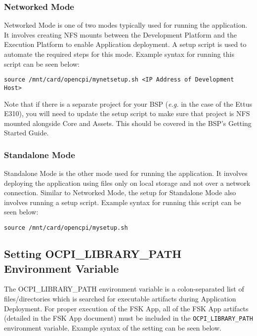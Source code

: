 \begin{flushleft}
\subsubsection{Networked Mode}
Networked Mode is one of two modes typically used for running the application. It involves creating NFS mounts between the Development Platform and the Execution Platform to enable Application deployment. A setup script is used to automate the required steps for this mode. Example syntax for running this script can be seen below:
\begin{verbatim}
source /mnt/card/opencpi/mynetsetup.sh <IP Address of Development Host>
\end{verbatim}
Note that if there is a separate project for your BSP (\textit{e.g.} in the case of the Ettus E310), you will need to update the setup script to make sure that project is NFS mounted alongside Core and Assets. This should be covered in the BSP's Getting Started Guide.
\subsubsection{Standalone Mode}
Standalone Mode is the other mode used for running the application. It involves deploying the application using files only on local storage and not over a network connection. Similar to Networked Mode, the setup for Standalone Mode also involves running a setup script. Example syntax for running this script can be seen below:
\begin{verbatim}
source /mnt/card/opencpi/mysetup.sh
\end{verbatim}
\subsection{Setting OCPI\_LIBRARY\_PATH Environment Variable}
The OCPI\_LIBRARY\_PATH environment variable is a colon-separated list of files/directories which is searched for executable artifacts during Application Deployment. For proper execution of the FSK App, all of the FSK App artifacts (detailed in the FSK App document) must be included in the \texttt{OCPI\_LIBRARY\_PATH} environment variable. Example syntax of the setting can be seen below.

\end{flushleft}
